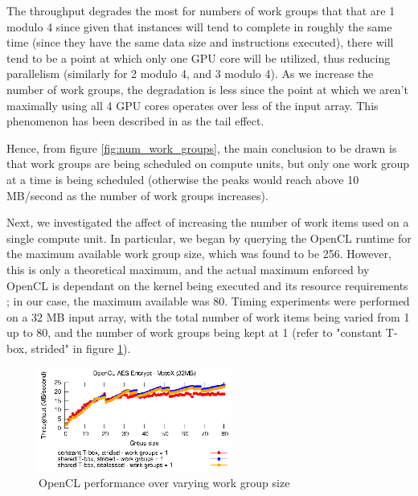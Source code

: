 \documentclass[conference,10pt]{IEEEtran}
\begin{document}
The throughput degrades the most for numbers of work groups that that are 1 modulo 4 since given that 
instances will tend to complete in roughly the same time (since they have the same data size and 
instructions executed), there will tend to be a point at which only one GPU core will be utilized, thus 
reducing parallelism (similarly for 2 modulo 4, and 3 modulo 4). As we increase the number of work groups, 
the degradation is less since the point at which we aren't maximally using all 4 GPU cores operates over 
less of the input array.  This phenomenon has been described in \cite{gpu_opt} as the tail effect.

Hence, from figure \ref{fig:num_work_groups}, the main conclusion to be drawn is that work groups are being 
scheduled on compute units, but only one work group at a time is being scheduled (otherwise the peaks 
would reach above 10 MB/second as the number of work groups increases).

Next, we investigated the affect of increasing the number of work items used on a single compute unit.  
In particular, we began by querying the OpenCL runtime for the maximum available work group size, which was 
found to be 256.  However, this is only a theoretical maximum, and the actual maximum enforced by OpenCL is 
dependant on the kernel being executed and its resource requirements \cite{opencl_guide}; in our case, the 
maximum available was 80.  Timing experiments were performed on a 32 MB input array, with the total number 
of work items being varied from 1 up to 80, and the number of work groups being kept at 1 (refer to 
"constant T-box, strided" in figure \ref{fig:work_group_size}).

\begin{figure}[!t]
\centering
\includegraphics[width=2.5in]{../final/motox/4.2/opencl_aes_group_size.constant_tbox.shared_tbox.shared_coalesced_tbox.eps}
\caption{OpenCL performance over varying work group size}
\label{fig:work_group_size}
\end{figure}
\end{document}
